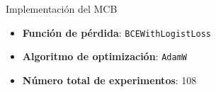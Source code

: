 \begin{frame}{Implementación del MCB}
	\begin{itemize}
		\item \textbf{Función de pérdida}: \texttt{BCEWithLogistLoss}
		\item \textbf{Algoritmo de optimización}: \texttt{AdamW}
	\end{itemize}
	
	
	\begin{table}[H]
		\centering 
		\caption{Valores de los hiperparámetros utilizados en los experimentos del modelo de clasificación binaria.}
		\label{tab:hiperBIN}
	\end{table}
	\begin{itemize}
		\item \textbf{Número total de experimentos}: 108
	\end{itemize}
\end{frame}

